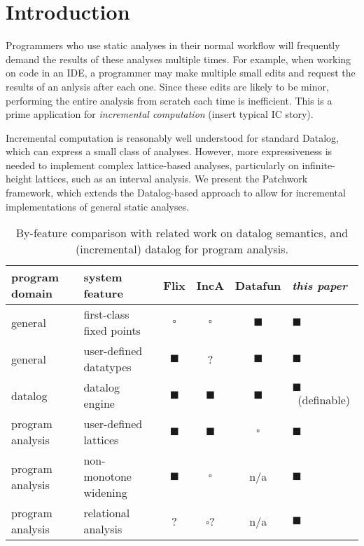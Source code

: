 \documentclass[acmlarge,anonymous]{acmart}\settopmatter{printfolios=true}
\begin{document}
\section{Introduction}

Programmers who use static analyses in their normal workflow will frequently demand the results of these analyses multiple times. For example, when working on code in an IDE, a programmer may make multiple small edits and request the results of an anlysis after each one. Since these edits are likely to be minor, performing the entire analysis from scratch each time is inefficient. This is a prime application for \textit{incremental computation} (insert typical IC story). 

Incremental computation is reasonably well understood for standard Datalog, which can express a small class of analyses. However, more expressiveness is needed to implement complex lattice-based analyses, particularly on infinite-height lattices, such as an interval analysis. We present the Patchwork framework, which extends the Datalog-based approach to allow for incremental implementations of general static analyses.

\newcommand{\TabYes}{\ensuremath{\blacksquare}}
\newcommand{\TabNo}{\ensuremath{\square}}

\begin{table}
\begin{tabular}{|p{1.3in}p{1.5in}||ccc|l|}
  \hline
  \textbf{program domain} &
  \textbf{system feature} & Flix & IncA & Datafun & \emph{this paper}
  \\
  \hline
  general &
  first-class  
  fixed points & \TabNo & \TabNo & \TabYes & \TabYes
  \\
  general &
  user-defined
  datatypes & \TabYes & ? & \TabYes & \TabYes
  \\
  \hline
  datalog &
  datalog engine & \TabYes & \TabYes & \TabYes & \TabYes~(definable)
  \\
  \hline
  program analysis &
  user-defined lattices & \TabYes & \TabYes & \TabNo & \TabYes
  \\
  program analysis &
  non-monotone 
  widening
  & \TabYes & \TabNo & n/a & \TabYes
  \\
  program analysis &
  relational 
  analysis
  & ? & \TabNo? & n/a & \TabYes
  \\
  \hline
\end{tabular}
\caption{By-feature comparison with related work on datalog semantics, and (incremental) datalog for program analysis.}
\label{tab:relatedwork}
\end{table}
\end{document}
